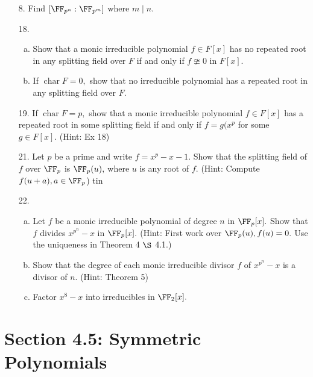 \documentclass{article}
\DeclareMathOperator{\cha}{char}
\begin{document}
\begin{itemize}
	\item[8.] Find $[\FF_{p^n}:\FF_{p^m}]$ where $m\mid n.$

	\item[18.]
		\begin{enumerate}[(a)]
			\item Show that a monic irreducible polynomial $f\in F[x]$ has no repeated root in any splitting field over $F$ if and only if $f\ncong 0$ in $F[x].$ 

			\item If $\cha F=0,$ show that no irreducible polynomial has a repeated root in any splitting field over $F.$
				
		\end{enumerate}

	\item[19.] If $\cha F=p,$ show that a monic irreducible polynomial $f\in F[x]$ has a repeated root in some splitting field if and only if $f=g(x^p$ for some $g\in F[x].$ (Hint: Ex 18)

	\item[21.] Let $p$ be a prime and write $f=x^p-x-1.$ Show that the splitting field of $f$ over $\FF_p$ is $\FF_p(u),$ where $u$ is any root of $f.$ (Hint: Compute $f(u+a), a\in\FF_p$)
tin
	\item[22.]
		\begin{enumerate}[(a)]
			\item Let $f$ be a monic irreducible polynomial of degree $n$ in $\FF_p[x].$ Show that $f$ divides $x^{p^n}-x$ in $\FF_p[x].$ (Hint: First work over $\FF_p(u), f(u)=0.$ Use the uniqueness in Theorem 4 $\S$ 4.1.)

			\item Show that the degree of each monic irreducible divisor $f$ of $x^{p^n}-x$ is a divisor of $n.$ (Hint: Theorem 5)

			\item Factor $x^8-x$ into irreducibles in $\FF_2[x].$

		\end{enumerate}
		
\end{itemize}

\section*{Section 4.5: Symmetric Polynomials}
\end{document}
